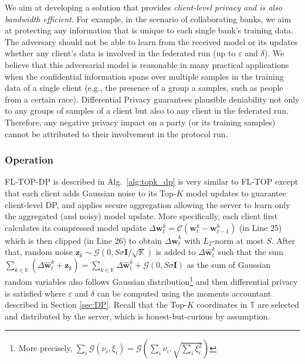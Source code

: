 \documentclass[accepted]{uai2021} %
\newcommand{\mbf}[1]{{\mathbf{#1}}}
\newcommand{\TOPK}{Top-$K$\xspace}
\begin{document}
We aim at developing a solution that provides \emph{client-level privacy and is also bandwidth efficient}. 
For example, in the scenario of collaborating banks, we aim at protecting any information that is unique to each single bank's training data.
The adversary should not be able to learn from the received model or its updates whether any client's data is involved in the federated run (up to $\varepsilon$ and $\delta$). 
We believe that this adversarial model is reasonable in many practical applications when the confidential information spans over multiple samples in the training data of a single client (e.g., the presence of a group a samples, such as people from a certain race). Differential Privacy guarantees plausible deniability not only to any groups of samples of a client but also to any client in the federated run. Therefore, any negative privacy impact on a party (or its training samples) cannot be attributed to their involvement in the protocol run.


\subsubsection{Operation}
\label{sec:operation}

FL-TOP-DP is described in Alg.~\ref{alg:topk_dp} is very similar to FL-TOP except that each client adds Gaussian noise to its \TOPK model updates to guarantee client-level DP, and applies secure aggregation allowing the server to learn only the aggregated (and noisy) model update. More specifically, each client first calculates its compressed model update $\Delta \mbf{w}_t^k = \mathcal{C}(\mbf{w}_{t}^k- \mbf{w}_{t-1}^k)$ (in Line 25) which is then clipped (in Line 26) to obtain $\Delta \hat{\mbf{w}}_t^k$ with $L_2$-norm at most $S$. After that, random noise $\mbf{z}_{k} \sim \mathcal{G}(0,S\mathbb{\sigma}\mathbf{I}/\sqrt{\mathbb{K}})$ is added to $\Delta \hat{\mbf{w}}_t^k$ such that the sum $\sum_{k \in \mathbb{K}} (\Delta \hat{\mbf{w}}_t^k +  \mbf{z}_{k}) = \sum_{k \in \mathbb{K}} \Delta \hat{\mbf{w}}_t^k + \mathcal{G}(0,S\mathbb{\sigma}\mathbf{I})$ as the sum of Gaussian random variables also follows Gaussian distribution\footnote{More precisely, $\sum_{i}\mathcal{G}(\nu_{i},\xi_{i})=\mathcal{G}(\sum_{i} \nu_{i},\sqrt{\sum_{i}\xi_{i}^{2}})$} and then differential privacy is satisfied where $\varepsilon$ and $\delta$ can be computed using the moments accountant described in Section \ref{sec:DP}. Recall that the \TOPK coordinates in $\mathbb{T}$ are selected and distributed by the server, which is honest-but-curious by assumption.
\end{document}
